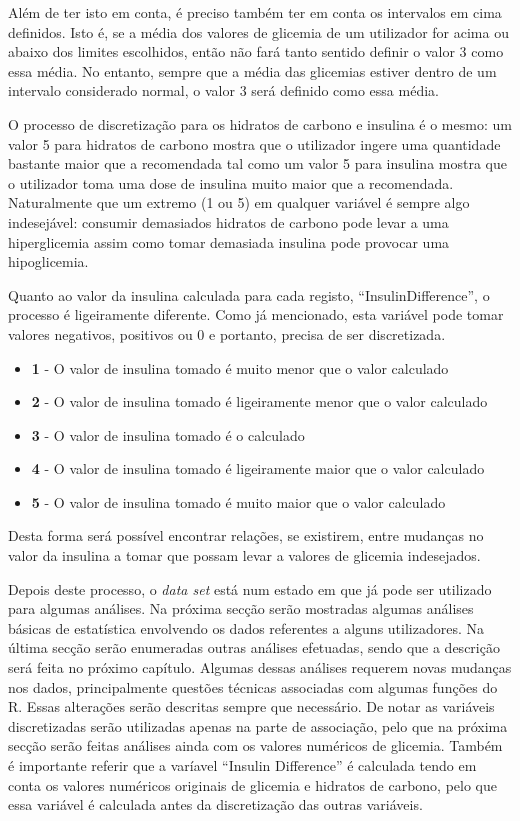 Além de ter isto em conta, é preciso também ter em conta os intervalos em cima definidos. Isto é, se a média dos valores de glicemia de um utilizador for acima ou abaixo dos limites escolhidos, então não fará tanto sentido definir o valor 3 como essa média. No entanto, sempre que a média das glicemias estiver dentro de um intervalo considerado normal, o valor 3 será definido como essa média.

O processo de discretização para os hidratos de carbono e insulina é o mesmo: um valor 5 para hidratos de carbono mostra que o utilizador ingere uma quantidade bastante maior que a recomendada tal como um valor 5 para insulina mostra que o utilizador toma uma dose de insulina muito maior que a recomendada. Naturalmente que um extremo (1 ou 5) em qualquer variável é sempre algo indesejável: consumir demasiados hidratos de carbono pode levar a uma hiperglicemia assim como tomar demasiada insulina pode provocar uma hipoglicemia.

Quanto ao valor da insulina calculada para cada registo, ``Insulin\textunderscore Difference'', o processo é ligeiramente diferente. Como já mencionado, esta variável pode tomar valores negativos, positivos ou 0 e portanto, precisa de ser discretizada.


\begin{itemize}
\item \textbf{1} - O valor de insulina tomado é muito menor que o valor calculado
\item \textbf{2} - O valor de insulina tomado é ligeiramente menor que o valor calculado
\item \textbf{3} - O valor de insulina tomado é o calculado
\item \textbf{4} - O valor de insulina tomado é ligeiramente maior que o valor calculado
\item \textbf{5} - O valor de insulina tomado é muito maior que o valor calculado
\end{itemize}
Desta forma será possível encontrar relações, se existirem, entre mudanças no valor da insulina a tomar que possam levar a valores de glicemia indesejados. 


Depois deste processo, o \textit{data set} está num estado em que já pode ser utilizado para algumas análises. Na próxima secção serão mostradas algumas análises básicas de estatística envolvendo os dados referentes a alguns utilizadores. Na última secção serão enumeradas outras análises efetuadas, sendo que a descrição será feita no próximo capítulo. Algumas dessas análises requerem novas mudanças nos dados, principalmente questões técnicas associadas com algumas funções do R. Essas alterações serão descritas sempre que necessário. De notar as variáveis discretizadas serão utilizadas apenas na parte de associação, pelo que na próxima secção serão feitas análises ainda com os valores numéricos de glicemia. Também é importante referir que a varíavel ``Insulin \textunderscore Difference'' é calculada tendo em conta os valores numéricos originais de glicemia e hidratos de carbono, pelo que essa variável é calculada antes da discretização das outras variáveis. 


